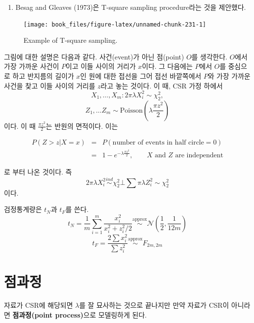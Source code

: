 \documentclass[b5paper,]{scrbook}
\providecommand{\tightlist}{%
  \setlength{\itemsep}{0pt}\setlength{\parskip}{0pt}}
\theoremstyle{plain}
\theoremstyle{definition}
\numberwithin{equation}{section}
\begin{document}
\begin{enumerate}
\def\labelenumi{\arabic{enumi}.}
\setcounter{enumi}{1}
\tightlist
\item
  Besag and Gleaves (1973)은 T-square sampling procedure라는 것을
  제안했다.
\end{enumerate}

\begin{figure}

{\centering \texttt{[image: book\_files/figure-latex/unnamed-chunk-231-1]} 

}

\caption{Example of T-square sampling.}\label{fig:unnamed-chunk-231}
\end{figure}

그림에 대한 설명은 다음과 같다. 사건(event)가 아닌 점(point) \(O\)를
생각한다. \(O\)에서 가장 가까운 사건이 \(P\)이고 이들 사이의 거리가
\(x\)이다. 그 다음에는 \(P\)에서 \(O\)를 중심으로 하고 반지름의 길이가
\(x\)인 원에 대한 접선을 그어 접선 바깥쪽에서 \(P\)와 가장 가까운 사건을
찾고 이들 사이의 거리를 \(z\)라고 놓는 것이다. 이 때, CSR 가정 하에서
\[X_{1}, \ldots, X_{m}: 2\pi\lambda X_{i}^{2} \sim \chi_{2}^{2},\]
\[Z_{1}, \ldots Z_{m} \sim \text{Poisson}(\lambda \frac{\pi z^{2}}{2})\]
이다. 이 때 \(\frac{\pi z^{2}}{2}\)는 반원의 면적이다. 이는

\begin{eqnarray*}
P(Z>z|X=x)&=& P(\text{number of events in half circle}=0)\\
&=& 1-e^{-\lambda \frac{\pi z^{2}}{2}}, \qquad{X \text{ and } Z \text{ are independent}}
\end{eqnarray*}

로 부터 나온 것이다. 즉
\[2\pi\lambda X_{i}^{2} \stackrel{ind}{\sim} \chi_{2}^{2} \bot \sum \pi\lambda Z_{i}^{2} \sim \chi_{2}^{2}\]
이다.

검정통계량은 \(t_{N}\)과 \(t_{F}\)를 쓴다.
\[t_{N}=\frac{1}{m}\sum_{i=1}^{m}\frac{x_{i}^{2}}{x_{i}^{2} + z_{i}^{2}/2} \stackrel{\text{approx}}{\sim}\mathcal{N}(\frac{1}{2}, \frac{1}{12m})\]
\[t_{F}=\frac{2\sum x_{i}^{2}}{\sum z_{i}^2} \stackrel{\text{approx}}{\sim} F_{2m,2m}\]

\chapter{점과정}\label{pointprocess}

자료가 CSR에 해당되면 \(\lambda\)를 잘 묘사하는 것으로 끝나지만 만약
자료가 CSR이 아니라면 \textbf{점과정(point process)}으로 모델링하게
된다.
\end{document}
